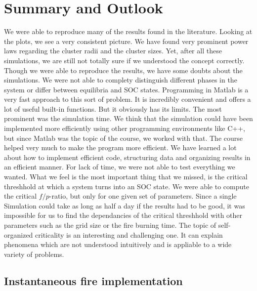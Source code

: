 \documentclass[11pt]{article}
\begin{document}
\section{Summary and Outlook}
We were able to reproduce many of the results found in the literature. Looking at the plots, we see a very consistent picture. We have found very prominent power laws regarding the cluster radii and the cluster sizes. 
Yet, after all these simulations, we are still not totally sure if we understood the concept correctly. Though we were able to reproduce the results, we have some doubts about the simulations. We were not able to complety distinguish different phases in the system or differ between equilibria and SOC states. 
Programming in Matlab is a very fast approach to this sort of problem. It is incredibly convenient and offers a lot of useful built-in functions. But it obviously has its limits. The most prominent was the simulation time. We think that the simulation could have been implemented more efficiently using other programming environments like C++, but since Matlab was the topic of the course, we worked with that. 
The course helped very much to make the program more efficient. We have learned a lot about how to implement efficient code, structuring data and organizing results in an efficient manner. 
For lack of time, we were not able to test everything we wanted. What we feel is the most important thing that we missed, is the critical threshhold at which a system turns into an SOC state. We were able to compute the critical $f/p$-ratio, but only for one given set of parameters. Since a single Simulation could take as long as half a day if the results had to be good, it was impossible for us to find the dependancies of the critical threshhold with other parameters such as the grid size or the fire burning time. 
The topic of self-organized criticality is an interesting and challenging one. It can explain phenomena which are not understood intuitively and is appliable to a wide variety of problems. 




\begin{appendix}
\section{Instantaneous fire implementation}








\end{appendix}
\end{document}

